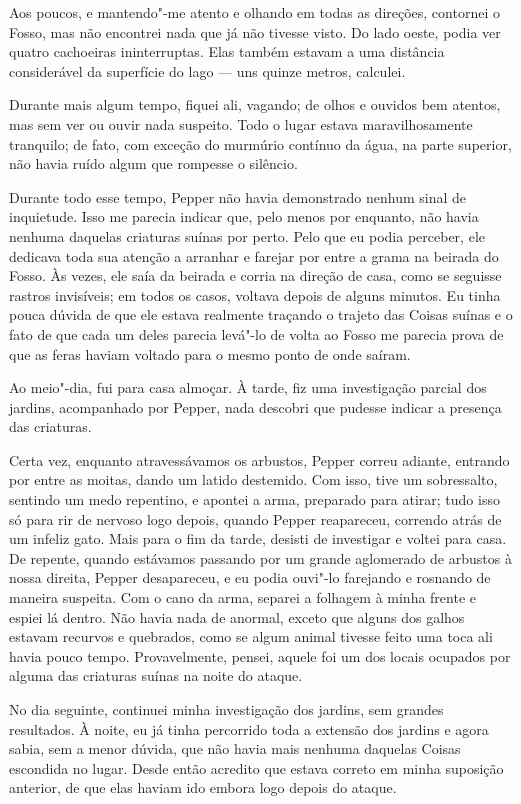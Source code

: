 Aos poucos, e mantendo"-me atento e olhando em todas as direções, contornei o Fosso, mas não encontrei nada que já não
tivesse visto. Do lado oeste, podia ver quatro cachoeiras ininterruptas. Elas também estavam a uma distância
considerável da superfície do lago --- uns quinze metros, calculei.

Durante mais algum tempo, fiquei ali, vagando; de olhos e ouvidos bem atentos, mas sem ver ou ouvir nada suspeito. Todo
o lugar estava maravilhosamente tranquilo; de fato, com exceção do murmúrio contínuo da água, na parte superior, não
havia ruído algum que rompesse o silêncio.

Durante todo esse tempo, Pepper não havia demonstrado nenhum sinal de inquietude. Isso me parecia indicar que, pelo
menos por enquanto, não havia nenhuma daquelas criaturas suínas por perto. Pelo que eu podia perceber, ele dedicava
toda sua atenção a arranhar e farejar por entre a grama na beirada do Fosso. Às vezes, ele saía da beirada e corria na
direção de casa, como se seguisse rastros invisíveis; em todos os casos, voltava depois de alguns minutos. Eu
tinha pouca dúvida de que ele estava realmente traçando o trajeto das Coisas suínas e o fato de que cada um deles
parecia levá"-lo de volta ao Fosso me parecia prova de que as feras haviam voltado para o mesmo ponto de onde saíram.

Ao meio"-dia, fui para casa almoçar. À tarde, fiz uma investigação parcial dos jardins, acompanhado por Pepper, nada
descobri que pudesse indicar a presença das criaturas.

Certa vez, enquanto atravessávamos os arbustos, Pepper correu adiante, entrando por entre as moitas, dando um latido
destemido. Com isso, tive um sobressalto, sentindo um medo repentino, e apontei a arma, preparado para atirar; tudo
isso só para rir de nervoso logo depois, quando Pepper reapareceu, correndo atrás de um infeliz gato. Mais para o fim
da tarde, desisti de investigar e voltei para casa. De repente, quando estávamos passando por um grande aglomerado de
arbustos à nossa direita, Pepper desapareceu, e eu podia ouvi"-lo farejando e rosnando de maneira suspeita. Com o cano
da arma, separei a folhagem à minha frente e espiei lá dentro. Não havia nada de anormal, exceto que alguns dos galhos
estavam recurvos e quebrados, como se algum animal tivesse feito uma toca ali havia pouco tempo. Provavelmente, pensei,
aquele foi um dos locais ocupados por alguma das criaturas suínas na noite do ataque.

No dia seguinte, continuei minha investigação dos jardins, sem grandes resultados. À noite, eu já tinha percorrido
toda a extensão dos jardins e agora sabia, sem a menor dúvida, que não havia mais nenhuma daquelas Coisas escondida no
lugar. Desde então acredito que estava correto em minha suposição anterior, de que elas haviam ido embora
logo depois do ataque.



